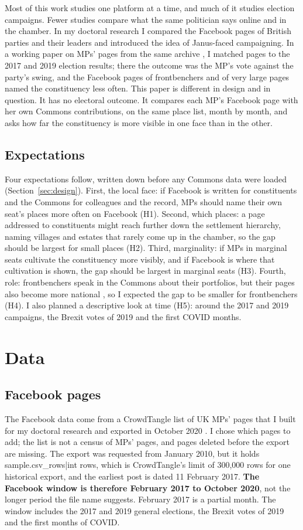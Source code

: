 \documentclass[11pt,a4paper]{article}
\begin{document}
Most of this work studies one platform at a time, and much of it studies election campaigns. Fewer studies compare what the same politician says online and in the chamber. In my doctoral research \citep{hotham2021} I compared the Facebook pages of British parties and their leaders and introduced the idea of Janus-faced campaigning. In a working paper on MPs' pages from the same archive \citep{hotham2027}, I matched pages to the 2017 and 2019 election results; there the outcome was the MP's vote against the party's swing, and the Facebook pages of frontbenchers and of very large pages named the constituency less often. This paper is different in design and in question. It has no electoral outcome. It compares each MP's Facebook page with her own Commons contributions, on the same place list, month by month, and asks how far the constituency is more visible in one face than in the other.

\subsection{Expectations}
Four expectations follow, written down before any Commons data were loaded (Section~\ref{sec:design}). First, the local face: if Facebook is written for constituents and the Commons for colleagues and the record, MPs should name their own seat's places more often on Facebook (H1). Second, which places: a page addressed to constituents might reach further down the settlement hierarchy, naming villages and estates that rarely come up in the chamber, so the gap should be largest for small places (H2). Third, marginality: if MPs in marginal seats cultivate the constituency more visibly, and if Facebook is where that cultivation is shown, the gap should be largest in marginal seats (H3). Fourth, role: frontbenchers speak in the Commons about their portfolios, but their pages also become more national \citep{hotham2027}, so I expected the gap to be smaller for frontbenchers (H4). I also planned a descriptive look at time (H5): around the 2017 and 2019 campaigns, the Brexit votes of 2019 and the first COVID months.

\section{Data}\label{sec:data}
\subsection{Facebook pages}
The Facebook data come from a CrowdTangle list of UK MPs' pages that I built for my doctoral research and exported in October 2020 \citep{crowdtangle2020,hotham2021}. I chose which pages to add; the list is not a census of MPs' pages, and pages deleted before the export are missing. The export was requested from January 2010, but it holds {{sample.csv_rows|int}} rows, which is CrowdTangle's limit of 300,000 rows for one historical export, and the earliest post is dated 11 February 2017. \textbf{The Facebook window is therefore February 2017 to October 2020}, not the longer period the file name suggests. February 2017 is a partial month. The window includes the 2017 and 2019 general elections, the Brexit votes of 2019 and the first months of COVID.
\end{document}
